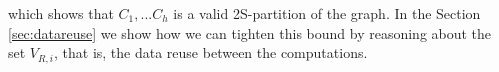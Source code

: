 \documentclass[sigconf]{acmart}
\begin{document}
	which shows that $C_1, ...C_h$ is a valid 2S-partition of the graph.
	In the Section \ref{sec:datareuse} we show how we can tighten this bound by 
	reasoning about the set $V_{R,i}$, that is, the data reuse between the 
	computations. 
	
	
	
%	
%	
%	
%	
%	
%	
\end{document}
